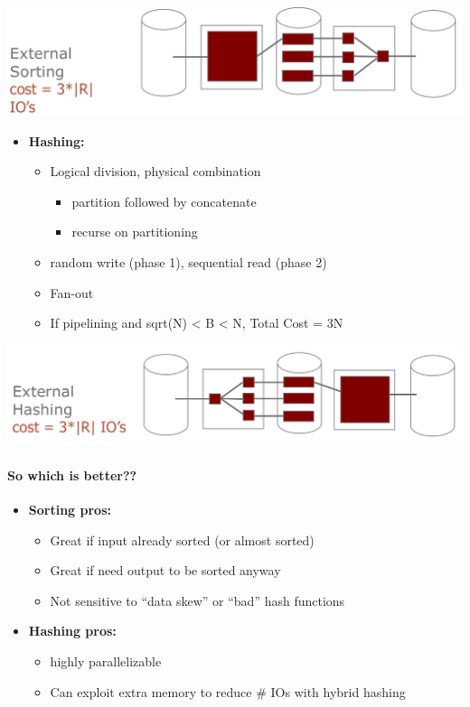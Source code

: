 \includegraphics[scale=0.16]{graphics/external-sorting.png}

\begin{itemize}
\item \textbf{Hashing:}
  \begin{itemize}
  \item Logical division, physical combination
    \begin{itemize}
    \item partition followed by concatenate
    \item recurse on partitioning
    \end{itemize}
  \item random write (phase 1), sequential read (phase 2)
  \item Fan-out
  \item If pipelining and sqrt(N) < B < N, Total Cost = 3N
  \end{itemize}
\end{itemize}

\includegraphics[scale=0.2]{graphics/external-hashing.png}

\paragraph{So which is better??}
\begin{itemize}
\item \textbf{Sorting pros:}
  \begin{itemize}
  \item Great if input already sorted (or almost sorted)
  \item Great if need output to be sorted anyway
  \item Not sensitive to ``data skew'' or ``bad'' hash functions
  \end{itemize}

\item \textbf{Hashing pros:}
  \begin{itemize}
  \item highly parallelizable
  \item Can exploit extra memory to reduce \# IOs with hybrid
    hashing
  \end{itemize}
\end{itemize}

